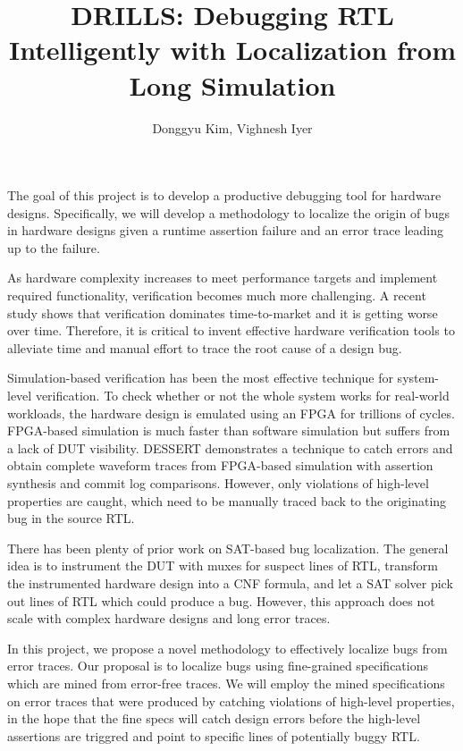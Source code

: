 \documentclass[11pt]{article}
\title{DRILLS: Debugging RTL Intelligently with Localization from Long Simulation}
\author{Donggyu Kim, Vighnesh Iyer}
\date{}
\begin{document}
\maketitle

The goal of this project is to develop a productive debugging tool for hardware designs. Specifically, we will develop a methodology to localize the origin of bugs in hardware designs given a runtime assertion failure and an error trace leading up to the failure.

As hardware complexity increases to meet performance targets and implement required functionality, verification becomes much more challenging. A recent study shows that verification dominates time-to-market and it is getting worse over time\supercite{Foster}. Therefore, it is critical to invent effective hardware verification tools to alleviate time and manual effort to trace the root cause of a design bug.

Simulation-based verification has been the most effective technique for system-level verification. To check whether or not the whole system works for real-world workloads, the hardware design is emulated using an FPGA for trillions of cycles. FPGA-based simulation is much faster than software simulation but suffers from a lack of DUT visibility. DESSERT\supercite{Kim2018} demonstrates a technique to catch errors and obtain complete waveform traces from FPGA-based simulation with assertion synthesis and commit log comparisons. However, only violations of high-level properties are caught, which need to be manually traced back to the originating bug in the source RTL.

There has been plenty of prior work on SAT-based bug localization\supercite{Veneris2003}\supercite{Chang2007}\supercite{Mirzaeian}. The general idea is to instrument the DUT with muxes for suspect lines of RTL, transform the instrumented hardware design into a CNF formula, and let a SAT solver pick out lines of RTL which could produce a bug. However, this approach does not scale with complex hardware designs and long error traces.

In this project, we propose a novel methodology to effectively localize bugs from error traces. Our proposal is to localize bugs using fine-grained specifications which are mined from error-free traces. We will employ the mined specifications on error traces that were produced by catching violations of high-level properties, in the hope that the fine specs will catch design errors before the high-level assertions are triggred and point to specific lines of potentially buggy RTL.
\end{document}
